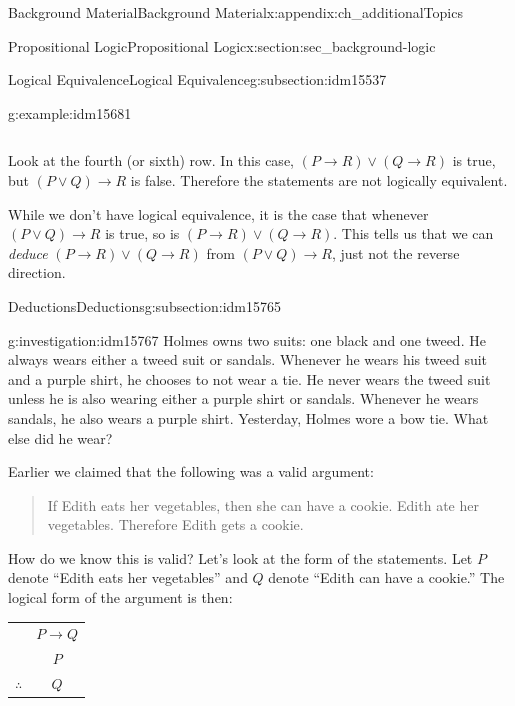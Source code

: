 \documentclass[oneside,10pt,]{book}
\numberwithin{equation}{chapter}
\newcommand{\hrulethin}  {\noalign{\hrule height 0.04em}}
\def\imp{\rightarrow}
\begin{document}
\begin{appendixptx}{Background Material}{}{Background Material}{}{}{x:appendix:ch_additionalTopics}
\begin{sectionptx}{Propositional Logic}{}{Propositional Logic}{}{}{x:section:sec_background-logic}
\begin{subsectionptx}{Logical Equivalence}{}{Logical Equivalence}{}{}{g:subsection:idm15537}
\begin{example}{}{g:example:idm15681}
\begin{sidebyside}{1}{0}{0}{0}
\begin{sbspanel}{1}
{\begin{tabular}{cAcAcBcAc}
\end{tabular}
\par}
\end{sbspanel}%
\end{sidebyside}%
\par
Look at the fourth (or sixth) row. In this case, \((P \imp R) \vee (Q \imp R)\) is true, but \((P \vee Q) \imp R\) is false. Therefore the statements are not logically equivalent.%
\par
While we don't have logical equivalence, it is the case that whenever \((P \vee Q) \imp R\) is true, so is \((P \imp R) \vee (Q \imp R)\).  This tells us that we can \emph{deduce} \((P \imp R) \vee (Q \imp R)\) from \((P \vee Q) \imp R\), just not the reverse direction.%
\end{example}
\end{subsectionptx}
%
%
\typeout{************************************************}
\typeout{************************************************}
%
\begin{subsectionptx}{Deductions}{}{Deductions}{}{}{g:subsection:idm15765}
\begin{investigation}{}{g:investigation:idm15767}%
Holmes owns two suits: one black and one tweed. He always wears either a tweed suit or sandals. Whenever he wears his tweed suit and a purple shirt, he chooses to not wear a tie. He never wears the tweed suit unless he is also wearing either a purple shirt or sandals. Whenever he wears sandals, he also wears a purple shirt. Yesterday, Holmes wore a bow tie. What else did he wear?%
\end{investigation}
Earlier we claimed that the following was a valid argument:%
\begin{quote}%
If Edith eats her vegetables, then she can have a cookie. Edith ate her vegetables. Therefore Edith gets a cookie.%
\end{quote}
How do we know this is valid? Let's look at the form of the statements. Let \(P\) denote ``Edith eats her vegetables'' and \(Q\) denote ``Edith can have a cookie.'' The logical form of the argument is then:%
\begin{sidebyside}{1}{0}{0}{0}%
\begin{sbspanel}{1}%
{\centering%
\begin{tabular}{cc}
&\(P \imp Q\)\tabularnewline[0pt]
&\(P\)\tabularnewline\hrulethin
\(\therefore\)&\(Q\)
\end{tabular}
\par}
\end{sbspanel}%

\end{sidebyside}
\end{subsectionptx}
\end{sectionptx}
\end{appendixptx}
\end{document}

